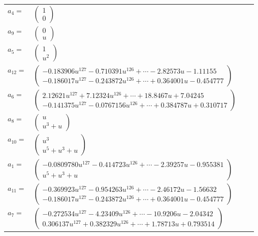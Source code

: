 \documentclass[1p]{elsarticle_modified}
\theoremstyle{definition}
\begin{document}
\begin{tabular}{m{7pt} m{180pt} m{7pt} m{180pt} }
\flushright $a_{4}=$&$\begin{pmatrix}1\\0\end{pmatrix}$ \\
\flushright $a_{9}=$&$\begin{pmatrix}0\\u\end{pmatrix}$ \\
\flushright $a_{5}=$&$\begin{pmatrix}1\\u^2\end{pmatrix}$ \\
\flushright $a_{12}=$&$\begin{pmatrix}-0.183906 u^{127}-0.710391 u^{126}+\cdots-2.82573 u-1.11155\\-0.186017 u^{127}-0.243872 u^{126}+\cdots+0.364001 u-0.454777\end{pmatrix}$ \\
\flushright $a_{6}=$&$\begin{pmatrix}2.12621 u^{127}+7.12324 u^{126}+\cdots+18.8467 u+7.04245\\-0.141375 u^{127}-0.0767156 u^{126}+\cdots+0.384787 u+0.310717\end{pmatrix}$ \\
\flushright $a_{8}=$&$\begin{pmatrix}u\\u^3+u\end{pmatrix}$ \\
\flushright $a_{10}=$&$\begin{pmatrix}u^3\\u^5+u^3+u\end{pmatrix}$ \\
\flushright $a_{1}=$&$\begin{pmatrix}-0.0809780 u^{127}-0.414723 u^{126}+\cdots-2.39257 u-0.955381\\u^5+u^3+u\end{pmatrix}$ \\
\flushright $a_{11}=$&$\begin{pmatrix}-0.369923 u^{127}-0.954263 u^{126}+\cdots-2.46172 u-1.56632\\-0.186017 u^{127}-0.243872 u^{126}+\cdots+0.364001 u-0.454777\end{pmatrix}$ \\
\flushright $a_{7}=$&$\begin{pmatrix}-0.272534 u^{127}-4.23409 u^{126}+\cdots-10.9206 u-2.04342\\0.306137 u^{127}+0.382329 u^{126}+\cdots+1.78713 u+0.793514\end{pmatrix}$ \\

\end{tabular}
\end{document}
